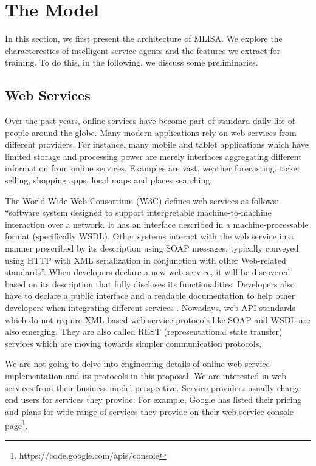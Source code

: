 \documentclass[10pt,journal,cspaper,compsoc]{IEEEtran}
\begin{document}



\section{The Model}\label{s:preliminaries}
In this section, we first present the architecture of MLISA. We explore the characterestics of intelligent service agents and the features we extract for training. To do this, in the following, we discuss some preliminaries.

\subsection{Web Services}\label{s:ws}

Over the past years, online services have become part of standard daily life of people around the globe. Many modern applications rely on web services from different providers. For instance, many mobile and tablet applications which have limited storage and processing power are merely interfaces aggregating different information from online services. Examples are vast, weather forecasting, ticket selling, shopping apps, local maps and places searching.

The World Wide Web Consortium (W3C) defines web services as follows: ``software system designed to support interpretable machine-to-machine interaction over a network. It has an interface described in a machine-processable format (specifically WSDL). Other systems interact with the web service in a manner prescribed by its description using SOAP messages, typically conveyed using HTTP with XML serialization in conjunction with other Web-related standards''. When developers declare a new web service, it will be
discovered based on its description that fully discloses its functionalities. Developers also have to declare a public interface and a readable documentation to help other developers when integrating different services \cite{w3cwsdl}. Nowadays, web API standards which do not require XML-based web service protocols like SOAP and WSDL are also emerging. They are also called REST (representational state transfer) services which are moving towards simpler communication protocols. 

We are not going to delve into engineering details of online web service implementation and its protocols in this proposal. We are interested in web services from their business model perspective. Service providers usually charge end users for services they provide. For example, Google has listed their pricing and plans for wide range of services they provide on their web service console page\footnote{https://code.google.com/apis/console}.
\end{document}
